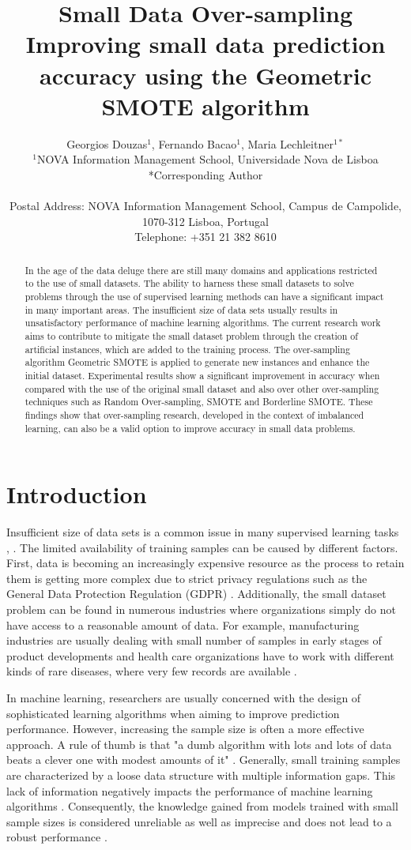 \documentclass[parskip=full]{scrartcl}
\title{Small Data Over-sampling  \\ \LARGE{Improving small data prediction accuracy using the Geometric SMOTE algorithm}}
\author{
	Georgios Douzas\(^{1}\), Fernando Bacao\(^{1}\), Maria Lechleitner\(^{1*}\) 
	\\
	\small{\(^{1}\)NOVA Information Management School, Universidade Nova de Lisboa}
	\\
	\small{*Corresponding Author}
	\\
	\\
	\small{Postal Address: NOVA Information Management School, Campus de Campolide, 1070-312 Lisboa, Portugal}
	\\
	\small{Telephone: +351 21 382 8610}
}
\date{}
\begin{document}
\maketitle

\begin{abstract}
In the age of the data deluge there are still many domains and applications
restricted to the use of small datasets. The ability to harness these small
datasets to solve problems through the use of supervised learning methods can
have a significant impact in many important areas. The insufficient size of data
sets usually results in unsatisfactory performance of machine learning
algorithms. The current research work aims to contribute to mitigate the small
dataset problem through the creation of artificial instances, which are added to
the training process. The over-sampling algorithm Geometric SMOTE is applied to
generate new instances and enhance the initial dataset. Experimental results
show a significant improvement in accuracy when compared with the use of the
original small dataset and also over other over-sampling techniques such as
Random Over-sampling, SMOTE and Borderline SMOTE. These findings show that
over-sampling research, developed in the context of imbalanced learning, can
also be a valid option to improve accuracy in small data problems.
\end{abstract}

\section{Introduction}
Insufficient size of data sets is a common issue in many supervised learning
tasks \cite{Niyogi.1998}, \cite{AbdulLateh.2017}. The limited availability of
training samples can be caused by different factors. First, data is becoming an
increasingly expensive resource \cite{Li.2007} as the process to retain them is
getting more complex due to strict privacy regulations such as the General Data
Protection Regulation (GDPR) \cite{EuropeanCommission.2019}. Additionally, the
small dataset problem can be found in numerous industries where organizations
simply do not have access to a reasonable amount of data. For example,
manufacturing industries are usually dealing with small number of samples in
early stages of product developments and health care organizations have to work
with different kinds of rare diseases, where very few records are available
\cite{AbdulLateh.2017}.

In machine learning, researchers are usually concerned with the design of
sophisticated learning algorithms when aiming to improve prediction performance.
However, increasing the sample size is often a more effective approach. A rule
of thumb is that "a dumb algorithm with lots and lots of data beats a clever one
with modest amounts of it" \cite{Domingos.2012}. Generally, small training
samples are characterized by a loose data structure with multiple information
gaps. This lack of information negatively impacts the performance of machine
learning algorithms \cite{Lin.2018}. Consequently, the knowledge gained from
models trained with small sample sizes is considered unreliable as well as
imprecise and does not lead to a robust performance \cite{AbdulLateh.2017}.
\end{document}
